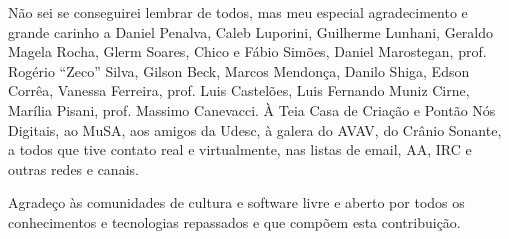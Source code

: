 \vspace{4 mm}

Não sei se conseguirei lembrar de todos, mas meu especial agradecimento e grande
carinho a Daniel Penalva, Caleb Luporini, Guilherme Lunhani, Geraldo Magela
Rocha, Glerm Soares, Chico e Fábio Simões, Daniel Marostegan, prof. Rogério
``Zeco'' Silva, Gilson Beck, Marcos Mendonça, Danilo Shiga, Edson Corrêa,
Vanessa Ferreira, prof. Luis Castelões, Luis Fernando Muniz Cirne, Marília
Pisani, prof. Massimo Canevacci. À Teia Casa de Criação e Pontão Nós Digitais,
ao MuSA, aos amigos da Udesc, à galera do AVAV, do Crânio Sonante, a todos que
tive contato real e virtualmente, nas listas de email, AA, IRC e outras redes e
canais.

\vspace{4 mm}

Agradeço às comunidades de cultura e software livre e aberto por todos os
conhecimentos e tecnologias repassados e que compõem esta contribuição.

\vspace{4 mm}

\begin{center}
\end{center}
